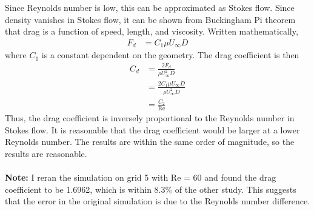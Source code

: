 Since Reynolds number is low, this can be approximated as Stokes flow. Since density vanishes in Stokes flow, it can be shown from Buckingham Pi theorem that drag is a function of speed, length, and viscosity. Written mathematically, 
\begin{align*}
    F_d &= C_1\mu U_\infty D
\end{align*}
where $C_1$ is a constant dependent on the geometry. The drag coefficient is then
\begin{align*}
    C_d &= \frac{2F_d}{\rho U_\infty^2 D} \\
    &= \frac{2 C_1 \mu U_\infty D}{\rho U_\infty^2 D} \\
    &= \boxed{\frac{C_2}{\text{Re}}}
\end{align*}
Thus, the drag coefficient is inversely proportional to the Reynolds number in Stokes flow. It is reasonable that the drag coefficient would be larger at a lower Reynolds number. The results are within the same order of magnitude, so the results are reasonable.
\\\\
\noindent \textbf{Note:} I reran the simulation on grid 5 with Re = 60 and found the drag coefficient to be 1.6962, which is within 8.3\% of the other study. This suggests that the error in the original simulation is due to the Reynolds number difference.